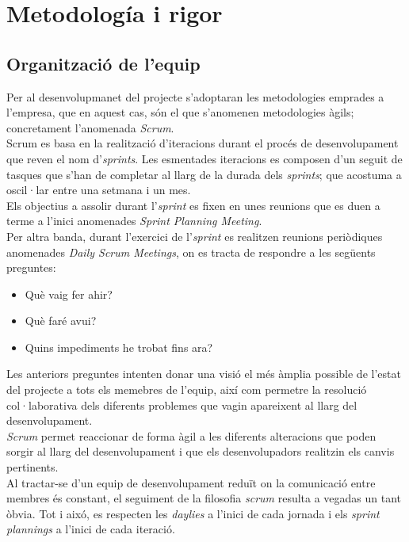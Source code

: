 \section{Metodología i rigor}

\subsection{Organització de l'equip}

Per al desenvolupmanet del projecte s'adoptaran les metodologies emprades a l'empresa, que en aquest cas, són el que s'anomenen metodologies àgils; concretament l'anomenada \textit{Scrum}\cite{scrum}.\\
Scrum es basa en la realització d'iteracions durant el procés de desenvolupament que reven el nom d'\textit{sprints}. Les esmentades iteracions es composen d'un seguit de tasques que s'han de completar al llarg de la durada dels \textit{sprints}; que acostuma a oscil·lar entre una setmana i un mes.\\
Els objectius a assolir durant l'\textit{sprint} es fixen en unes reunions que es duen a terme a l'inici anomenades \textit{Sprint Planning Meeting}.\\
Per altra banda, durant l'exercici de l'\textit{sprint} es realitzen reunions periòdiques anomenades \textit{Daily Scrum Meetings}, on es tracta de respondre a les següents preguntes:

\begin{itemize}
	\item Què vaig fer ahir?
	\item Què faré avui?
	\item Quins impediments he trobat fins ara?
\end{itemize}
Les anteriors preguntes intenten donar una visió el més àmplia possible de l'estat del projecte a tots els memebres de l'equip, així com permetre la resolució col·laborativa dels diferents problemes que vagin apareixent al llarg del desenvolupament.\\
\textit{Scrum} permet reaccionar de forma àgil a les diferents alteracions que poden sorgir al llarg del desenvolupament i que els desenvolupadors realitzin els canvis pertinents.\\
Al tractar-se d'un equip de desenvolupament reduït on la comunicació entre membres és constant, el seguiment de la filosofia \textit{scrum} resulta a vegadas un tant òbvia. Tot i aixó, es respecten les \textit{daylies} a l'inici de cada jornada i els \textit{sprint plannings} a l'inici de cada iteració.

